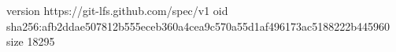 version https://git-lfs.github.com/spec/v1
oid sha256:afb2ddae507812b555eceb360a4cea9c570a55d1af496173ac5188222b445960
size 18295
